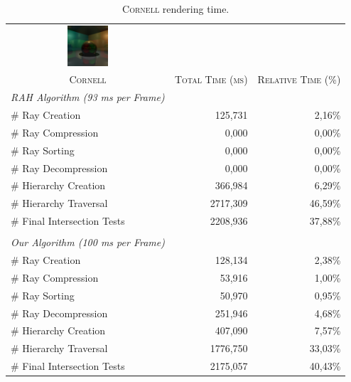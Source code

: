 \documentclass{egpubl}
\begin{document}
\begin{table}[!htb]
\begin{center}
\fontsize{7}{9}
\selectfont
\begin{tabular}{l|rr}
    \multicolumn{1}{c}{\includegraphics[width=1.5cm]{Images/Cornell_Preview}} & & \\
    \multicolumn{1}{c|}{\textsc{Cornell}} & \textsc{Total Time (ms)} & \textsc{Relative Time (\%)}\\
    \hline
    \emph{RAH Algorithm (93 ms per Frame)} & & \\
    \hline
    \quad \# Ray Creation               & 125,731	& 2,16\%	\\
    \quad \# Ray Compression            & 0,000     & 0,00\%	\\
    \quad \# Ray Sorting                & 0,000	    & 0,00\%    \\
    \quad \# Ray Decompression          & 0,000	    & 0,00\%    \\
    \quad \# Hierarchy Creation         & 366,984	& 6,29\%    \\
    \quad \# Hierarchy Traversal        & 2717,309	& 46,59\%   \\
    \quad \# Final Intersection Tests   & 2208,936	& 37,88\%	\\
    & & \\
    \hline
    \emph{Our Algorithm (100 ms per Frame)} & & \\
    \hline
    \quad \# Ray Creation               & 128,134	& 2,38\%	\\
    \quad \# Ray Compression            & 53,916    & 1,00\%	\\
    \quad \# Ray Sorting                & 50,970    & 0,95\%    \\
    \quad \# Ray Decompression          & 251,946   & 4,68\%    \\
    \quad \# Hierarchy Creation         & 407,090   & 7,57\%    \\
    \quad \# Hierarchy Traversal        & 1776,750  & 33,03\%   \\
    \quad \# Final Intersection Tests   & 2175,057  & 40,43\%	\\
\end{tabular}
\end{center}
\caption{\label{table:cornell-time-results}
\textsc{Cornell} rendering time.}
\end{table}
\end{document}
